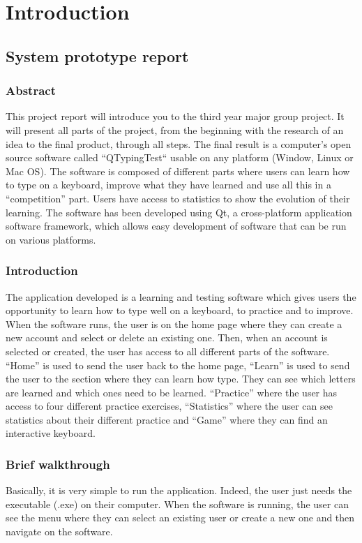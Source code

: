 \part{Introduction}

\chapter{System prototype report}

\section{Abstract}
This project report will introduce you to the third year major group project. It will present all parts of the project, from the beginning with the research of an idea to the final product, through all steps. The final result is a computer's open source software called “QTypingTest“ usable on any platform (Window, Linux or Mac OS). The software is composed of different parts where users can learn how to type on a keyboard, improve what they have learned and use all this in a “competition” part. Users have access to statistics to show the evolution of their learning. The software has been developed using Qt, a cross-platform application software framework, which allows easy development of software that can be run on various platforms. 

\section{Introduction}
The application developed is a learning and testing software which gives users the opportunity to learn how to type well on a keyboard, to practice and to improve. When the software runs, the user is on the home page where they can create a new account and select or delete an existing one. Then, when an account is selected or created, the user has access to all different parts of the software. “Home” is used to send the user back to the home page, “Learn” is used to send the user to the section where they can learn how type. They can see which letters are learned and which ones need to be learned. “Practice” where the user has access to four different practice exercises, “Statistics” where the user can see statistics about their different practice and “Game” where they can find an interactive keyboard. 

\section{Brief walkthrough}
Basically, it is very simple to run the application. Indeed, the user just needs the executable (.exe) on their computer. When the software is running, the user can see the menu where they can select an existing user or create a new one and then navigate on the software. 

